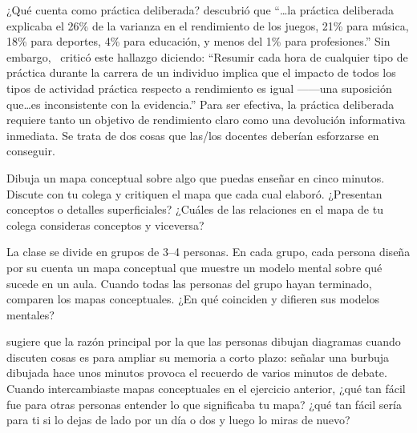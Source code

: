 \begin{aside}{¿Qué cuenta como práctica deliberada?}
  \cite{Macn2014} descubrió que
  ``{\ldots}la práctica deliberada explicaba el 26\% de la varianza en el rendimiento de los juegos,
  21\% para música,
  18\% para deportes,
  4\% para educación,
  y menos del 1\% para profesiones.''
  Sin embargo,~\cite{Eric2016} criticó este hallazgo diciendo:
  ``Resumir cada hora de cualquier tipo de práctica durante la carrera de un individuo
 implica que el impacto de todos los tipos de actividad práctica respecto a rendimiento es igual ------una suposición
  que{\ldots}es inconsistente con la evidencia.''
  Para ser efectiva,
  la práctica deliberada requiere tanto un objetivo de rendimiento claro
  como una devolución informativa inmediata.
  Se trata de dos cosas que las/los docentes deberían esforzarse en conseguir.
\end{aside}



Dibuja un mapa conceptual sobre algo que puedas enseñar en cinco minutos.
Discute con tu colega y critiquen el mapa que cada cual elaboró.
¿Presentan conceptos o detalles superficiales?
¿Cuáles de las relaciones en el mapa de tu colega consideras conceptos y viceversa?


La clase se divide en grupos de 3--4 personas.
En cada grupo, cada persona diseña por su cuenta un mapa conceptual que muestre un modelo mental sobre qué sucede en un aula.
Cuando todas las personas del grupo hayan terminado,
comparen los mapas conceptuales.
¿En qué coinciden y difieren sus modelos mentales?


\cite{Cher2007} sugiere que
la razón principal por la que las personas dibujan diagramas cuando discuten cosas
es para ampliar su memoria a corto plazo:
señalar una burbuja dibujada hace unos minutos provoca el recuerdo de varios minutos de debate.
Cuando intercambiaste mapas conceptuales en el ejercicio anterior,
¿qué tan fácil fue para otras personas entender lo que significaba tu mapa?
¿qué tan fácil sería para ti si lo dejas de lado por un día o dos y luego lo miras de nuevo?


